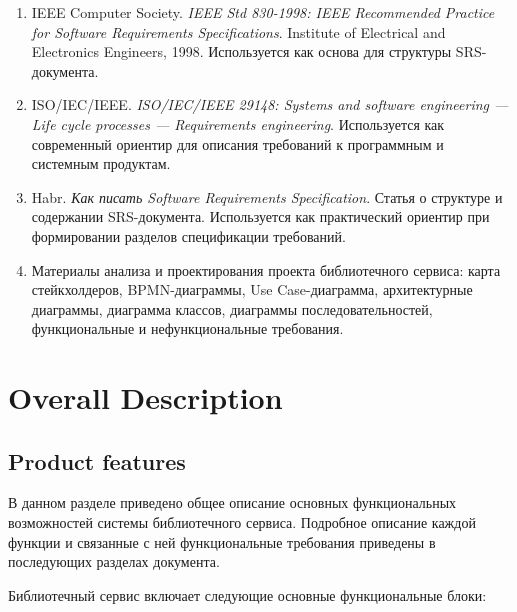 \documentclass[12pt,a4paper]{article}
\begin{document}
	\begin{enumerate}
		\item IEEE Computer Society. \textit{IEEE Std 830-1998: IEEE Recommended Practice
			for Software Requirements Specifications}. Institute of Electrical and Electronics
		Engineers, 1998. Используется как основа для структуры SRS-документа.
		
		\item ISO/IEC/IEEE. \textit{ISO/IEC/IEEE 29148: Systems and software engineering ---
			Life cycle processes --- Requirements engineering}. Используется как современный
		ориентир для описания требований к программным и системным продуктам.
		
		\item Habr. \textit{Как писать Software Requirements Specification}.
		Статья о структуре и содержании SRS-документа. Используется как практический
		ориентир при формировании разделов спецификации требований.
		
		\item Материалы анализа и проектирования проекта библиотечного сервиса:
		карта стейкхолдеров, BPMN-диаграммы, Use Case-диаграмма, архитектурные
		диаграммы, диаграмма классов, диаграммы последовательностей, функциональные
		и нефункциональные требования.
	\end{enumerate}
	\newpage
	
	\section{Overall Description}
	
	\subsection{Product features}
	
	В данном разделе приведено общее описание основных функциональных возможностей
	системы библиотечного сервиса. Подробное описание каждой функции и связанные с ней
	функциональные требования приведены в последующих разделах документа.
	
	Библиотечный сервис включает следующие основные функциональные блоки:
	
\end{document}
